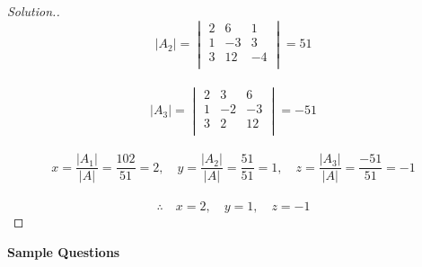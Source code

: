 \documentclass[11pt,a4paper]{article}
\theoremstyle{definition}
\newenvironment{solution}
  {\renewcommand{\qedsymbol}{}\begin{proof}[\textit{Solution}.]}
  {\end{proof}}
\begin{document}
\begin{solution}
$$|A_2|=
\begin{vmatrix}
2 & 6 & 1\\
1 & -3 & 3\\
3 & 12 & -4\\
\end{vmatrix}
=51$$\\

$$|A_3|=
\begin{vmatrix}
2 & 3 & 6\\
1 & -2 & -3\\
3 & 2 & 12\\
\end{vmatrix}
=-51$$\\

$$x=\frac{|A_1|}{|A|}=\frac{102}{51}=2,\quad  y=\frac{|A_2|}{|A|}=\frac{51}{51}=1,\quad  z=\frac{|A_3|}{|A|}=\frac{-51}{51}=-1$$\\

$$\therefore \quad  x=2,\quad  y=1,\quad  z=-1$$
\end{solution}
\pagebreak
\begin{center}
\textbf{Sample Questions}
\end{center}
\end{document}
